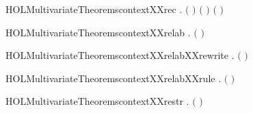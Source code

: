 \begin{SaveVerbatim}{HOLMultivariateTheoremscontextXXrec}
\HOLTokenTurnstile{} \HOLSymConst{\HOLTokenForall{}}  .
         \ensuremath{(}  \ensuremath{)} \HOLSymConst{\HOLTokenImp{}}
          \HOLSymConst{\HOLTokenConj{}}  \ensuremath{(} \ensuremath{)} \ensuremath{(} \ensuremath{)}
\end{SaveVerbatim}
\newcommand{\HOLMultivariateTheoremscontextXXrec}{\UseVerbatim{HOLMultivariateTheoremscontextXXrec}}
\begin{SaveVerbatim}{HOLMultivariateTheoremscontextXXrelab}
\HOLTokenTurnstile{} \HOLSymConst{\HOLTokenForall{}}  .   \ensuremath{(}  \ensuremath{)} \HOLSymConst{\HOLTokenImp{}}   
\end{SaveVerbatim}
\newcommand{\HOLMultivariateTheoremscontextXXrelab}{\UseVerbatim{HOLMultivariateTheoremscontextXXrelab}}
\begin{SaveVerbatim}{HOLMultivariateTheoremscontextXXrelabXXrewrite}
\HOLTokenTurnstile{} \HOLSymConst{\HOLTokenForall{}}  .   \ensuremath{(}  \ensuremath{)} \HOLSymConst{\HOLTokenEquiv{}}   
\end{SaveVerbatim}
\newcommand{\HOLMultivariateTheoremscontextXXrelabXXrewrite}{\UseVerbatim{HOLMultivariateTheoremscontextXXrelabXXrewrite}}
\begin{SaveVerbatim}{HOLMultivariateTheoremscontextXXrelabXXrule}
\HOLTokenTurnstile{} \HOLSymConst{\HOLTokenForall{}}  .    \HOLSymConst{\HOLTokenImp{}}   \ensuremath{(}  \ensuremath{)}
\end{SaveVerbatim}
\newcommand{\HOLMultivariateTheoremscontextXXrelabXXrule}{\UseVerbatim{HOLMultivariateTheoremscontextXXrelabXXrule}}
\begin{SaveVerbatim}{HOLMultivariateTheoremscontextXXrestr}
\HOLTokenTurnstile{} \HOLSymConst{\HOLTokenForall{}}  .   \ensuremath{(}  \ensuremath{)} \HOLSymConst{\HOLTokenImp{}}   
\end{SaveVerbatim}
